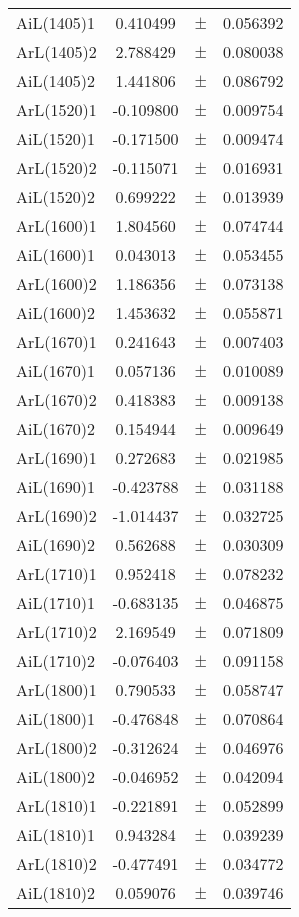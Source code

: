 \begin{table}
\begin{tiny}
\begin{tabular}{lccc}
AiL(1405)1 & 0.410499 & $\pm$ & 0.056392 \\
ArL(1405)2 & 2.788429 & $\pm$ & 0.080038 \\
AiL(1405)2 & 1.441806 & $\pm$ & 0.086792 \\
ArL(1520)1 & -0.109800 & $\pm$ & 0.009754 \\
AiL(1520)1 & -0.171500 & $\pm$ & 0.009474 \\
ArL(1520)2 & -0.115071 & $\pm$ & 0.016931 \\
AiL(1520)2 & 0.699222 & $\pm$ & 0.013939 \\
ArL(1600)1 & 1.804560 & $\pm$ & 0.074744 \\
AiL(1600)1 & 0.043013 & $\pm$ & 0.053455 \\
ArL(1600)2 & 1.186356 & $\pm$ & 0.073138 \\
AiL(1600)2 & 1.453632 & $\pm$ & 0.055871 \\
ArL(1670)1 & 0.241643 & $\pm$ & 0.007403 \\
AiL(1670)1 & 0.057136 & $\pm$ & 0.010089 \\
ArL(1670)2 & 0.418383 & $\pm$ & 0.009138 \\
AiL(1670)2 & 0.154944 & $\pm$ & 0.009649 \\
ArL(1690)1 & 0.272683 & $\pm$ & 0.021985 \\
AiL(1690)1 & -0.423788 & $\pm$ & 0.031188 \\
ArL(1690)2 & -1.014437 & $\pm$ & 0.032725 \\
AiL(1690)2 & 0.562688 & $\pm$ & 0.030309 \\
ArL(1710)1 & 0.952418 & $\pm$ & 0.078232 \\
AiL(1710)1 & -0.683135 & $\pm$ & 0.046875 \\
ArL(1710)2 & 2.169549 & $\pm$ & 0.071809 \\
AiL(1710)2 & -0.076403 & $\pm$ & 0.091158 \\
ArL(1800)1 & 0.790533 & $\pm$ & 0.058747 \\
AiL(1800)1 & -0.476848 & $\pm$ & 0.070864 \\
ArL(1800)2 & -0.312624 & $\pm$ & 0.046976 \\
AiL(1800)2 & -0.046952 & $\pm$ & 0.042094 \\
ArL(1810)1 & -0.221891 & $\pm$ & 0.052899 \\
AiL(1810)1 & 0.943284 & $\pm$ & 0.039239 \\
ArL(1810)2 & -0.477491 & $\pm$ & 0.034772 \\
AiL(1810)2 & 0.059076 & $\pm$ & 0.039746 \\

\end{tabular}
\end{tiny}
\end{table}
